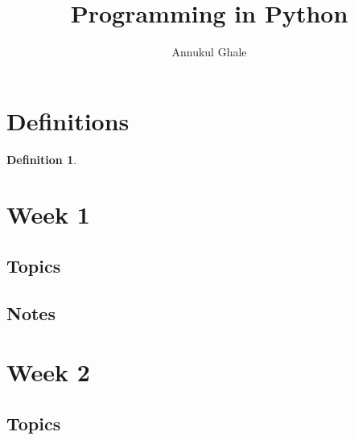 \documentclass[12pt]{article}
\newtheorem{definition}{Definition}
\begin{document}
\title{\textbf{Programming in Python}}
\author{Annukul Ghale}


\maketitle

\tableofcontents
\newpage



\section{Definitions}


\begin{definition}
\end{definition}



\section{Week 1}

\subsection{Topics}



\subsection{Notes}






\section{Week 2}

\subsection{Topics}
\end{document}
